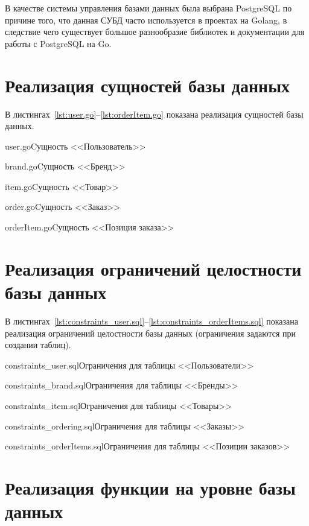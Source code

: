 \documentclass{bmstu}
\begin{document}
В качестве системы управления базами данных была выбрана PostgreSQL по причине того, что данная СУБД часто используется в проектах на Golang, в следствие чего существует большое разнообразие библиотек и документации для работы с PostgreSQL на Go.

\pagebreak

\section{Реализация сущностей базы данных}

В листингах~\ref{lst:user.go}--\ref{lst:orderItem.go} показана реализация сущностей базы данных.

{user.go}{Cущность <<Пользователь>>}

{brand.go}{Cущность <<Бренд>>}

{item.go}{Cущность <<Товар>>}

\pagebreak

{order.go}{Cущность <<Заказ>>}

{orderItem.go}{Cущность <<Позиция заказа>>}



\section{Реализация ограничений целостности базы данных}

В листингах~\ref{lst:constraints_user.sql}--\ref{lst:constraints_orderItems.sql} показана реализация ограничений целостности базы данных (ограничения задаются при создании таблиц).

{constraints_user.sql}{Ограничения для таблицы <<Пользователи>>}

\pagebreak

{constraints_brand.sql}{Ограничения для таблицы <<Бренды>>}

{constraints_item.sql}{Ограничения для таблицы <<Товары>>}

{constraints_ordering.sql}{Ограничения для таблицы <<Заказы>>}

\pagebreak

{constraints_orderItems.sql}{Ограничения для таблицы <<Позиции заказов>>}

\section{Реализация функции на уровне базы данных}
\end{document}
